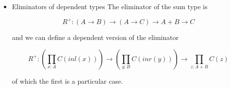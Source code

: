 \documentclass[11pt]{article}
\begin{document}
\begin{itemize}
\[\begin{tikzcd}
    & $\sum$ &          & $\prod$ &       \\
$+$  &        & $\times$ &         & $\to$
\end{tikzcd}\]

\item Eliminators of dependent types
\label{sec-9-3-2-9}
The eliminator of the sum type is

\[
R^+ : (A \to B) \to (A \to C) \to A + B \to C
\]

and we can define a dependent version of the eliminator

\[
R^+ : \left( \prod_{x:A} C(inl(x)) \right) \to 
\left(\prod_{y:B} C(inr(y))\right) \to
\prod_{z: A+B} C(z)
\]

of which the first is a particular case.
\end{itemize}
\end{document}
